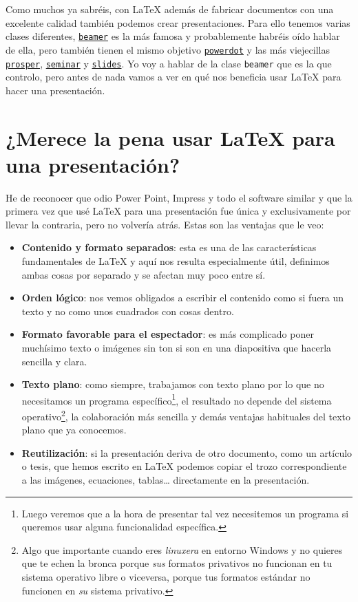 Como muchos ya sabréis, con LaTeX además de fabricar documentos con una
excelente calidad también podemos crear presentaciones. Para ello
tenemos varias clases diferentes,
\href{https://www.ctan.org/pkg/beamer}{\lstinline!beamer!} es la más
famosa y probablemente habréis oído hablar de ella, pero también tienen
el mismo objetivo
\href{http://www.ctan.org/pkg/powerdot/}{\lstinline!powerdot!} y las más
viejecillas \href{http://www.ctan.org/pkg/prosper}{\lstinline!prosper!},
\href{https://www.ctan.org/pkg/seminar}{\lstinline!seminar!} y
\href{http://www.ctan.org/pkg/slides}{\lstinline!slides!}. Yo voy a
hablar de la clase \lstinline!beamer! que es la que controlo, pero antes
de nada vamos a ver en qué nos beneficia usar LaTeX para hacer una
presentación.

\section{¿Merece la pena usar LaTeX para una
presentación?}

He de reconocer que odio Power Point, Impress y todo el software similar
y que la primera vez que usé LaTeX para una presentación fue única y
exclusivamente por llevar la contraria, pero no volvería atrás. Estas
son las ventajas que le veo:

\begin{itemize}
\item
  \textbf{Contenido y formato separados}: esta es una de las
  características fundamentales de LaTeX y aquí nos resulta
  especialmente útil, definimos ambas cosas por separado y se afectan
  muy poco entre sí.
\item
  \textbf{Orden lógico}: nos vemos obligados a escribir el contenido
  como si fuera un texto y no como unos cuadrados con cosas dentro.
\item
  \textbf{Formato favorable para el espectador}: es más complicado poner
  muchísimo texto o imágenes sin ton si son en una diapositiva que
  hacerla sencilla y clara.
\item
  \textbf{Texto plano}: como siempre, trabajamos con texto plano por lo
  que no necesitamos un programa específico\footnote{Luego veremos que a
    la hora de presentar tal vez necesitemos un programa si queremos
    usar alguna funcionalidad específica.}, el resultado no depende del
  sistema operativo\footnote{Algo que importante cuando eres
    \emph{linuxera} en entorno Windows y no quieres que te echen la
    bronca porque \emph{sus} formatos privativos no funcionan en tu
    sistema operativo libre o viceversa, porque tus formatos estándar no
    funcionen en \emph{su} sistema privativo.}, la colaboración más
  sencilla y demás ventajas habituales del texto plano que ya conocemos.
\item
  \textbf{Reutilización}: si la presentación deriva de otro documento,
  como un artículo o tesis, que hemos escrito en LaTeX podemos copiar el
  trozo correspondiente a las imágenes, ecuaciones, tablas\ldots{}
  directamente en la presentación.
\end{itemize}

